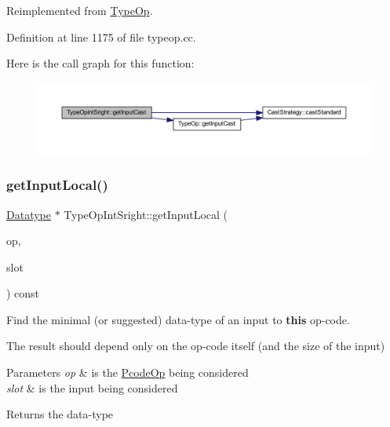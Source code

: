 Reimplemented from \mbox{\hyperlink{class_type_op_a950c417e4af100d176a701af5816b5ab}{Type\+Op}}.



Definition at line 1175 of file typeop.\+cc.

Here is the call graph for this function\+:
\nopagebreak
\begin{figure}[H]
\begin{center}
\leavevmode
\includegraphics[width=350pt]{class_type_op_int_sright_aa7d3a668c673ad21f266ac14b3a5f417_cgraph}
\end{center}
\end{figure}
\mbox{\label{class_type_op_int_sright_a684bdbbed1aa1ac2fc0d08caf5e0ca24}} 
\subsubsection{\texorpdfstring{getInputLocal()}{getInputLocal()}}
{\footnotesize\ttfamily \mbox{\hyperlink{class_datatype}{Datatype}} $\ast$ Type\+Op\+Int\+Sright\+::get\+Input\+Local (\begin{DoxyParamCaption}\item[{const \mbox{\hyperlink{class_pcode_op}{Pcode\+Op}} $\ast$}]{op,  }\item[{int4}]{slot }\end{DoxyParamCaption}) const\hspace{0.3cm}{\ttfamily [virtual]}}



Find the minimal (or suggested) data-\/type of an input to {\bfseries{this}} op-\/code. 

The result should depend only on the op-\/code itself (and the size of the input) 
\begin{DoxyParams}{Parameters}
{\em op} & is the \mbox{\hyperlink{class_pcode_op}{Pcode\+Op}} being considered \\
\hline
{\em slot} & is the input being considered \\
\hline
\end{DoxyParams}
\begin{DoxyReturn}{Returns}
the data-\/type 
\end{DoxyReturn}


